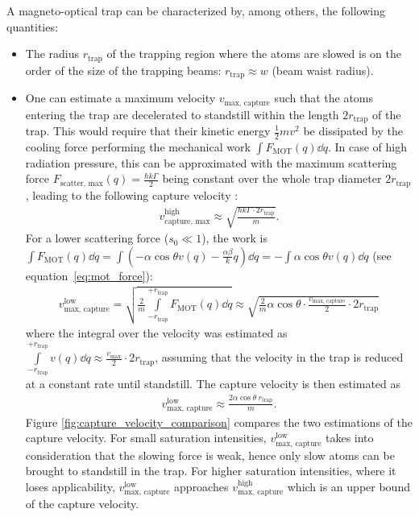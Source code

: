 A magneto-optical trap can be characterized by, among others, the following quantities:
\begin{itemize}
    \item The radius $r_\text{trap}$ of the trapping region where the atoms are slowed  is on the order of the size of the trapping beams: $r_\text{trap} \approx w$ (beam waist radius).
    \item One can estimate a maximum velocity $v_\text{max, capture}$ such that the atoms entering the trap are decelerated to standstill within the length $2r_\text{trap}$ of the trap. This would require that their kinetic energy $\frac{1}{2}mv^2$ be dissipated by the cooling force performing the mechanical work $\int F_\text{MOT}(q) \dd{q}$. In case of high radiation pressure, this can be approximated with the maximum scattering force $F_\text{scatter, max}(q) = \frac{\hbar k \Gamma}{2}$ being constant over the whole trap diameter $2 r_\text{trap}$, leading to the following capture velocity \cite{lunden_enhancing_2020}:
    \begin{align}\label{eq:capture_velocity_high}
        v_\text{capture, max}^\text{high} \approx \sqrt{\frac{\hbar k \Gamma \cdot 2 r_\text{trap}}{m}}.
    \end{align}
     For a lower scattering force ($s_0 \ll 1$), the work is $\int F_\text{MOT}(q)\dd{q}= \int (-\alpha \cos \theta v(q) - \frac{\alpha\beta}{k}q) \dd{q} = - \int \alpha \cos \theta v(q) \dd{q}$ (see equation~\ref{eq:mot_force}):
    \begin{align}
            v_\text{max, capture}^\text{low}
            = \sqrt{\frac{2}{m} \int\limits_{-r_\text{trap}}^{+r_\text{trap}} F_\text{MOT}(q) \dd{q}} 
            \approx \sqrt{\frac{2}{m} \alpha \cos \theta \cdot \frac{v_\text{max, capture}}{2} \cdot 2r_\text{trap}}
    \end{align}
    where the integral over the velocity was estimated as $\int\limits_{-r_\text{trap}}^{+r_\text{trap}}  v(q) \dd{q} \approx \frac{v_\text{max}}{2} \cdot 2r_\text{trap}$, assuming that the velocity in the trap is reduced at a constant rate until standstill. The capture velocity is then estimated as
    \begin{align}\label{eq:capture_velocity_low}
        v_\text{max, capture}^\text{low} \approx \frac{2 \alpha \cos \theta ~ r_\text{trap}}{m}.
    \end{align}
    Figure \ref{fig:capture_velocity_comparison} compares the two estimations of the capture velocity. For small saturation intensities, $v_\text{max, capture}^\text{low}$ takes into consideration that the slowing force is weak, hence only slow atoms can be brought to standstill in the trap. For higher saturation intensities, where it loses applicability, $v_\text{max, capture}^\text{low}$ approaches $v_\text{max, capture}^\text{high}$ which is an upper bound of the capture velocity.

\end{itemize}
